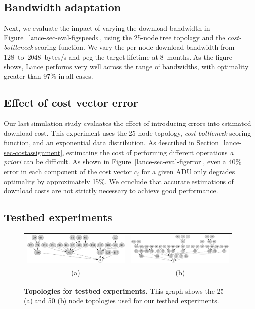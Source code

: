 \subsection{Bandwidth adaptation} 
\label{lance-sec-eval-params}

Next, we evaluate the impact of varying the download bandwidth in
Figure~\ref{lance-sec-eval-figspeeds}, using the 25-node tree topology and
the \emph{cost-bottleneck} scoring function. We vary the per-node download
bandwidth from 128~to~2048~bytes/s and peg the target lifetime at 8~months.
As the figure shows, Lance performs very well across the range of bandwidths,
with optimality greater than 97\% in all cases.

\subsection{Effect of cost vector error}

Our last simulation study evaluates the effect of introducing errors into
estimated download cost. This experiment uses the 25-node topology,
\emph{cost-bottleneck} scoring function, and an exponential data
distribution.  As described in Section~\ref{lance-sec-costassignment}, estimating
the cost of performing different operations {\em a priori} can be difficult.
As shown in Figure~\ref{lance-sec-eval-figerror}, even a 40\% error in each
component of the cost vector $\bar{c}_i$ for a given ADU only degrades
optimality by approximately 15\%. We conclude that accurate estimations
of download costs are not strictly necessary to achieve good performance.


\subsection{Testbed experiments}
\label{lance-sec-eval-policies}

\begin{figure}[t]
\label{lance-sec-eval-topologies}
\begin{center}
\begin{tabular}{cc}
\includegraphics[width=0.45\hsize]{./4-lance/figs/gwa/topologies/25.pdf} &
\includegraphics[width=0.45\hsize]{./4-lance/figs/gwa/topologies/50.pdf} \\
(a) &
(b)\\
\end{tabular}
\end{center}
\caption{\textbf{Topologies for testbed experiments.} 
This graph shows the 25 (a) and 50 (b) node topologies used for our testbed
experiments.}
\end{figure}

